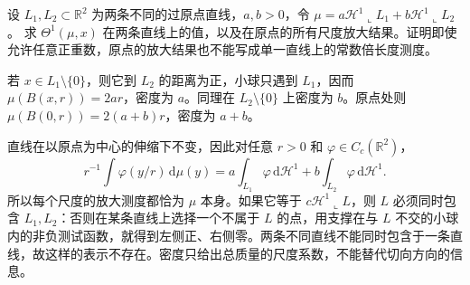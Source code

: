 \begin{exercise}\label{g3:ex:crossing-weighted-lines}
	设 \(L_1,L_2\subset\mathbb R^2\) 为两条不同的过原点直线，\(a,b>0\)，令
	\(\mu=a\mathcal H^1\llcorner L_1+b\mathcal H^1\llcorner L_2\)。
	求 \(\Theta^1(\mu,x)\) 在两条直线上的值，以及在原点的所有尺度放大结果。证明即使允许任意正重数，原点的放大结果也不能写成单一直线上的常数倍长度测度。
\end{exercise}
\begin{solution}
	若 \(x\in L_1\setminus\{0\}\)，则它到 \(L_2\) 的距离为正，小球只遇到 \(L_1\)，因而
	\(\mu(B(x,r))=2ar\)，密度为 \(a\)。同理在 \(L_2\setminus\{0\}\) 上密度为 \(b\)。原点处则
	\(\mu(B(0,r))=2(a+b)r\)，密度为 \(a+b\)。

	直线在以原点为中心的伸缩下不变，因此对任意 \(r>0\) 和 \(\varphi\in C_c(\mathbb R^2)\)，
	\[
		r^{-1}\int\varphi(y/r)\,\mathrm d\mu(y)
		=a\int_{L_1}\varphi\,\mathrm d\mathcal H^1
		+b\int_{L_2}\varphi\,\mathrm d\mathcal H^1.
	\]
	所以每个尺度的放大测度都恰为 \(\mu\) 本身。如果它等于 \(c\mathcal H^1\llcorner L\)，则 \(L\) 必须同时包含 \(L_1,L_2\)：否则在某条直线上选择一个不属于 \(L\) 的点，用支撑在与 \(L\) 不交的小球内的非负测试函数，就得到左侧正、右侧零。两条不同直线不能同时包含于一条直线，故这样的表示不存在。密度只给出总质量的尺度系数，不能替代切向方向的信息。
\end{solution}

